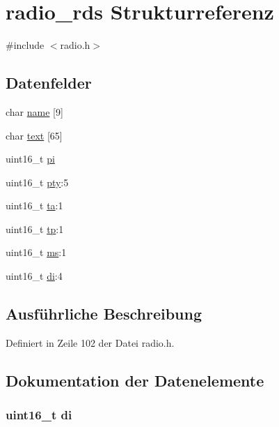 \hypertarget{structradio__rds}{}\section{radio\+\_\+rds Strukturreferenz}
\label{structradio__rds}


{\ttfamily \#include $<$radio.\+h$>$}

\subsection*{Datenfelder}
\begin{DoxyCompactItemize}
\item 
char \hyperlink{structradio__rds_a00c5e915306c0baea463b99ba6c09c4f}{name} \mbox{[}9\mbox{]}
\item 
char \hyperlink{structradio__rds_a1d7cd4d36a6a2fa49631cef5d5847187}{text} \mbox{[}65\mbox{]}
\item 
uint16\+\_\+t \hyperlink{structradio__rds_ad1803744db28ac0d226ec8da9134598e}{pi}
\item 
uint16\+\_\+t \hyperlink{structradio__rds_a6a555813c441b0e0dce51020817fa68e}{pty}\+:5
\item 
uint16\+\_\+t \hyperlink{structradio__rds_aaa7c4cc5a934d489d475d0f7d26e437c}{ta}\+:1
\item 
uint16\+\_\+t \hyperlink{structradio__rds_a92aabb0ca71171ea02dd5cf0ada0d536}{tp}\+:1
\item 
uint16\+\_\+t \hyperlink{structradio__rds_a8d03256977e8f265177523adc9bab6c0}{ms}\+:1
\item 
uint16\+\_\+t \hyperlink{structradio__rds_aaea7b514ca0c80db1989dc43cf4fe3c1}{di}\+:4
\end{DoxyCompactItemize}


\subsection{Ausführliche Beschreibung}


Definiert in Zeile 102 der Datei radio.\+h.



\subsection{Dokumentation der Datenelemente}
\hypertarget{structradio__rds_aaea7b514ca0c80db1989dc43cf4fe3c1}{}
\subsubsection[{di}]{\setlength{\rightskip}{0pt plus 5cm}uint16\+\_\+t di}\label{structradio__rds_aaea7b514ca0c80db1989dc43cf4fe3c1}


